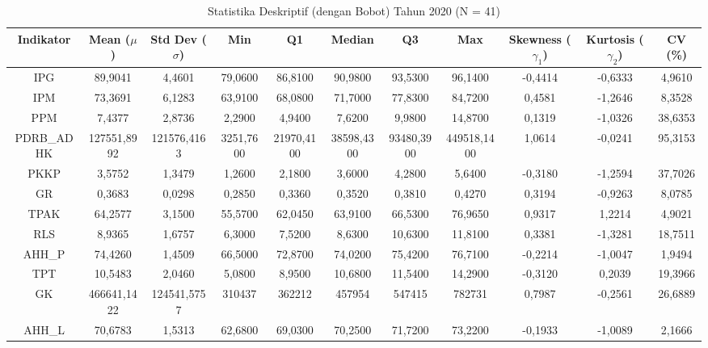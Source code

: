 \begin{table}[H]
\centering
\caption{Statistika Deskriptif (dengan Bobot) Tahun 2020 (N = 41)} \label{tab:app1desc_2020}
\begin{adjustbox}{max width=\textwidth, max height=0.85\textheight}
\begin{tabular}{|c|c|c|c|c|c|c|c|c|c|c|}
\hline
\textbf{Indikator} & \textbf{Mean ($\mu$)} & \textbf{Std Dev ($\sigma$)} & \textbf{Min} & \textbf{Q1} & \textbf{Median} & \textbf{Q3} & \textbf{Max} & \textbf{Skewness ($\gamma_1$)} & \textbf{Kurtosis ($\gamma_2$)} & \textbf{CV (\%)} \\
\hline
IPG & 89,9041 & 4,4601 & 79,0600 & 86,8100 & 90,9800 & 93,5300 & 96,1400 & -0,4414 & -0,6333 & 4,9610 \\
IPM & 73,3691 & 6,1283 & 63,9100 & 68,0800 & 71,7000 & 77,8300 & 84,7200 & 0,4581 & -1,2646 & 8,3528 \\
PPM & 7,4377 & 2,8736 & 2,2900 & 4,9400 & 7,6200 & 9,9800 & 14,8700 & 0,1319 & -1,0326 & 38,6353 \\
PDRB\_ADHK & 127551,8992 & 121576,4163 & 3251,7600 & 21970,4100 & 38598,4300 & 93480,3900 & 449518,1400 & 1,0614 & -0,0241 & 95,3153 \\
PKKP & 3,5752 & 1,3479 & 1,2600 & 2,1800 & 3,6000 & 4,2800 & 5,6400 & -0,3180 & -1,2594 & 37,7026 \\
GR & 0,3683 & 0,0298 & 0,2850 & 0,3360 & 0,3520 & 0,3810 & 0,4270 & 0,3194 & -0,9263 & 8,0785 \\
TPAK & 64,2577 & 3,1500 & 55,5700 & 62,0450 & 63,9100 & 66,5300 & 76,9650 & 0,9317 & 1,2214 & 4,9021 \\
RLS & 8,9365 & 1,6757 & 6,3000 & 7,5200 & 8,6300 & 10,6300 & 11,8100 & 0,3381 & -1,3281 & 18,7511 \\
AHH\_P & 74,4260 & 1,4509 & 66,5000 & 72,8700 & 74,0200 & 75,4200 & 76,7100 & -0,2214 & -1,0047 & 1,9494 \\
TPT & 10,5483 & 2,0460 & 5,0800 & 8,9500 & 10,6800 & 11,5400 & 14,2900 & -0,3120 & 0,2039 & 19,3966 \\
GK & 466641,1422 & 124541,5757 & 310437 & 362212 & 457954 & 547415 & 782731 & 0,7987 & -0,2561 & 26,6889 \\
AHH\_L & 70,6783 & 1,5313 & 62,6800 & 69,0300 & 70,2500 & 71,7200 & 73,2200 & -0,1933 & -1,0089 & 2,1666 \\
\hline
\end{tabular}
\end{adjustbox}
\end{table}